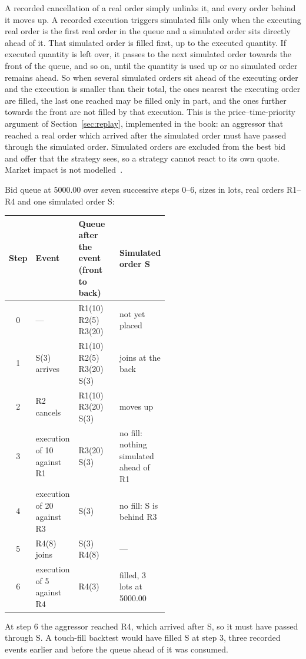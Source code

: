 A recorded cancellation of a real order simply unlinks it, and every order behind it moves up. A
recorded execution triggers simulated fills only when the executing real order is the first real
order in the queue and a simulated order sits directly ahead of it. That simulated order is filled first, up to the
executed quantity. If executed quantity is left over, it passes to the next simulated order towards the front of the
queue, and so on, until the quantity is used up or no simulated order remains ahead. So when several simulated
orders sit ahead of the executing order and the execution is smaller than their total, the ones nearest the
executing order are filled, the last one reached may be filled only in part, and the ones further towards the front
are not filled by that execution. This is the price--time-priority argument of
Section~\ref{sec:replay}, implemented in the book: an aggressor that reached a
real order which arrived after the simulated order must have passed through the simulated order.
Simulated orders are excluded from the best bid and offer that the strategy sees, so a strategy
cannot react to its own quote. Market impact is not modelled~\citep{maciejewski_shadow}.

\begin{example}
\label{ex:trace}
Bid queue at 5000.00 over seven successive steps 0--6, sizes in lots, real orders R1--R4 and
one simulated order S:
\begin{center}\footnotesize
\setlength{\tabcolsep}{3pt}
\begin{tabularx}{\linewidth}{c>{\raggedright\arraybackslash}p{0.27\linewidth}>{\raggedright\arraybackslash}p{0.27\linewidth}>{\raggedright\arraybackslash}X}
\toprule
Step & Event & Queue after the event (front to back) & Simulated order S \\
\midrule
0 & --- & R1(10) R2(5) R3(20) & not yet placed \\
1 & S(3) arrives & R1(10) R2(5) R3(20) S(3) & joins at the back \\
2 & R2 cancels & R1(10) R3(20) S(3) & moves up \\
3 & execution of 10 against R1 & R3(20) S(3) & no fill: nothing simulated ahead of R1 \\
4 & execution of 20 against R3 & S(3) & no fill: S is behind R3 \\
5 & R4(8) joins & S(3) R4(8) & --- \\
6 & execution of 5 against R4 & R4(3) & filled, 3 lots at 5000.00 \\
\bottomrule
\end{tabularx}
\end{center}
At step 6 the aggressor reached R4, which arrived after S, so it must have passed through S. A
touch-fill backtest would have filled S at step 3, three recorded events earlier and before the
queue ahead of it was consumed.
\end{example}

